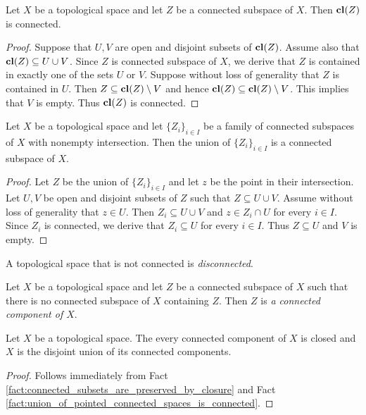 \begin{fact}\label{fact:connected_subsets_are_preserved_by_closure}
	Let $X$ be a topological space and let $Z$ be a connected subspace of $X$. Then $\mathbf{cl}(Z)$ is connected.
\end{fact}
\begin{proof}
	Suppose that $U, V$ are open and disjoint subsets of $\mathbf{cl}(Z)$. Assume also that $\mathbf{cl}(Z) \subseteq U\cup V$. Since $Z$ is connected subspace of $X$, we derive that $Z$ is contained in exactly one of the sets $U$ or $V$. Suppose without loss of generality that $Z$ is contained in $U$. Then $Z \subseteq \mathbf{cl}(Z) \setminus V$ and hence $\mathbf{cl}(Z) \subseteq \mathbf{cl}(Z)\setminus V$. This implies that $V$ is empty. Thus $\mathbf{cl}(Z)$ is connected.
\end{proof}

\begin{fact}\label{fact:union_of_pointed_connected_spaces_is_connected}
	Let $X$ be a topological space and let $\{Z_i\}_{i\in I}$ be a family of connected subspaces of $X$ with nonempty intersection. Then the union of $\{Z_i\}_{i\in I}$ is a connected subspace of $X$.
\end{fact}
\begin{proof}
	Let $Z$ be the union of $\{Z_i\}_{i\in I}$ and let $z$ be the point in their intersection. Let $U,V$ be open and disjoint subsets of $Z$ such that $Z \subseteq U\cup V$. Assume without loss of generality that $z \in U$. Then $Z_i \subseteq U\cup V$ and $z\in Z_i\cap U$ for every $i\in I$. Since $Z_i$ is connected, we derive that $Z_i\subseteq U$ for every $i \in I$. Thus $Z \subseteq U$ and $V$ is empty.
\end{proof}

\begin{definition}
	A topological space that is not connected is \textit{disconnected}.
\end{definition}

\begin{definition}
	Let $X$ be a topological space and let $Z$ be a connected subspace of $X$ such that there is no connected subspace of $X$ containing $Z$. Then $Z$ is \textit{a connected component of $X$}.
\end{definition}

\begin{corollary}\label{corollary:space_is_a_union_of_its_connected_components_which_are_closed}
	Let $X$ be a topological space. The every connected component of $X$ is closed and $X$ is the disjoint union of its connected components.
\end{corollary}
\begin{proof}
	Follows immediately from Fact \ref{fact:connected_subsets_are_preserved_by_closure} and Fact \ref{fact:union_of_pointed_connected_spaces_is_connected}.
\end{proof}


\small






